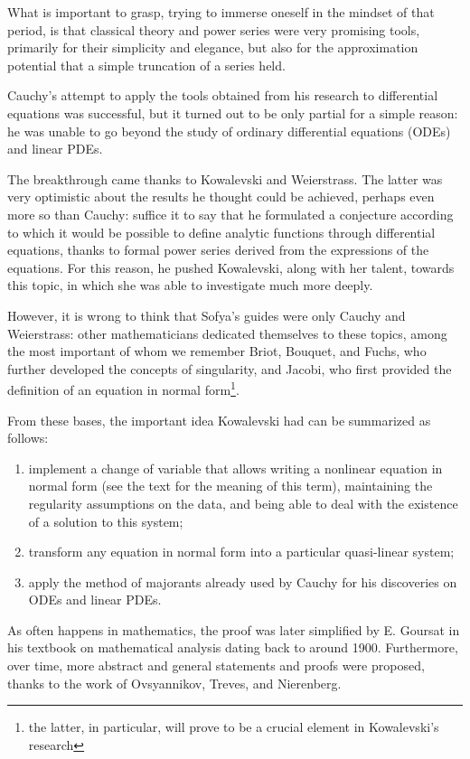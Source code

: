 What is important to grasp, trying to immerse oneself in the mindset of that period, is that classical theory and power series were very promising tools, primarily for their simplicity and elegance, but also for the approximation potential that a simple truncation of a series held.

Cauchy's attempt to apply the tools obtained from his research to differential equations was successful, but it turned out to be only partial for a simple reason: he was unable to go beyond the study of ordinary differential equations (ODEs) and linear PDEs.

The breakthrough came thanks to Kowalevski and Weierstrass. The latter was very optimistic about the results he thought could be achieved, perhaps even more so than Cauchy: suffice it to say that he formulated a conjecture according to which it would be possible to define analytic functions through differential equations, thanks to formal power series derived from the expressions of the equations. For this reason, he pushed Kowalevski, along with her talent, towards this topic, in which she was able to investigate much more deeply.

However, it is wrong to think that Sofya's guides were only Cauchy and Weierstrass: other mathematicians dedicated themselves to these topics, among the most important of whom we remember Briot, Bouquet, and Fuchs, who further developed the concepts of singularity, and Jacobi, who first provided the definition of an equation in normal form\footnote{the latter, in particular, will prove to be a crucial element in Kowalevski's research}.

From these bases, the important idea Kowalevski had can be summarized as follows:
\begin{enumerate}
\item implement a change of variable that allows writing a nonlinear equation in normal form (see the text for the meaning of this term), maintaining the regularity assumptions on the data, and being able to deal with the existence of a solution to this system;
\item transform any equation in normal form into a particular quasi-linear system;
\item apply the method of majorants already used by Cauchy for his discoveries on ODEs and linear PDEs.
\end{enumerate}
As often happens in mathematics, the proof was later simplified by E. Goursat in his textbook on mathematical analysis dating back to around 1900. Furthermore, over time, more abstract and general statements and proofs were proposed, thanks to the work of Ovsyannikov, Treves, and Nierenberg.


